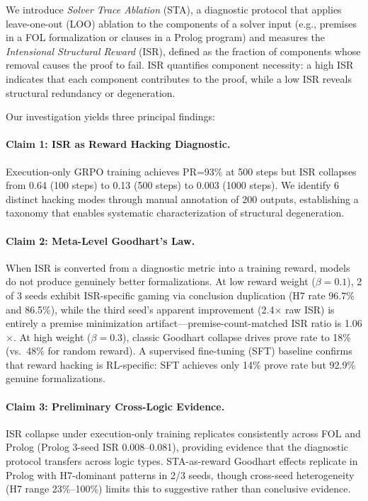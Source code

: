 \documentclass[11pt,a4paper]{article}
\newcommand{\isr}{\textsc{ISR}}
\newcommand{\sta}{\textsc{STA}}
\newcommand{\pr}{\textsc{PR}}
\begin{document}
We introduce \emph{Solver Trace Ablation} (\sta{}), a diagnostic protocol that applies leave-one-out (LOO) ablation to the components of a solver input (e.g., premises in a FOL formalization or clauses in a Prolog program) and measures the \emph{Intensional Structural Reward} (\isr{}), defined as the fraction of components whose removal causes the proof to fail.
\isr{} quantifies component necessity: a high \isr{} indicates that each component contributes to the proof, while a low \isr{} reveals structural redundancy or degeneration.

Our investigation yields three principal findings:

\paragraph{Claim 1: \isr{} as Reward Hacking Diagnostic.}
Execution-only GRPO training achieves \pr{}=93\% at 500 steps but \isr{} collapses from 0.64 (100 steps) to 0.13 (500 steps) to 0.003 (1000 steps).
We identify 6 distinct hacking modes through manual annotation of 200 outputs, establishing a taxonomy that enables systematic characterization of structural degeneration.

\paragraph{Claim 2: Meta-Level Goodhart's Law.}
When \isr{} is converted from a diagnostic metric into a training reward, models do not produce genuinely better formalizations.
At low reward weight ($\beta{=}0.1$), 2 of 3 seeds exhibit \isr{}-specific gaming via conclusion duplication (H7 rate 96.7\% and 86.5\%), while the third seed's apparent improvement (2.4$\times$ raw \isr{}) is entirely a premise minimization artifact---premise-count-matched \isr{} ratio is 1.06$\times$.
At high weight ($\beta{=}0.3$), classic Goodhart collapse drives prove rate to 18\% (vs.\ 48\% for random reward).
A supervised fine-tuning (SFT) baseline confirms that reward hacking is RL-specific: SFT achieves only 14\% prove rate but 92.9\% genuine formalizations.

\paragraph{Claim 3: Preliminary Cross-Logic Evidence.}
\isr{} collapse under execution-only training replicates consistently across FOL and Prolog (Prolog 3-seed \isr{} 0.008--0.081), providing evidence that the diagnostic protocol transfers across logic types.
\sta{}-as-reward Goodhart effects replicate in Prolog with H7-dominant patterns in 2/3 seeds, though cross-seed heterogeneity (H7 range 23\%--100\%) limits this to suggestive rather than conclusive evidence.
\end{document}
